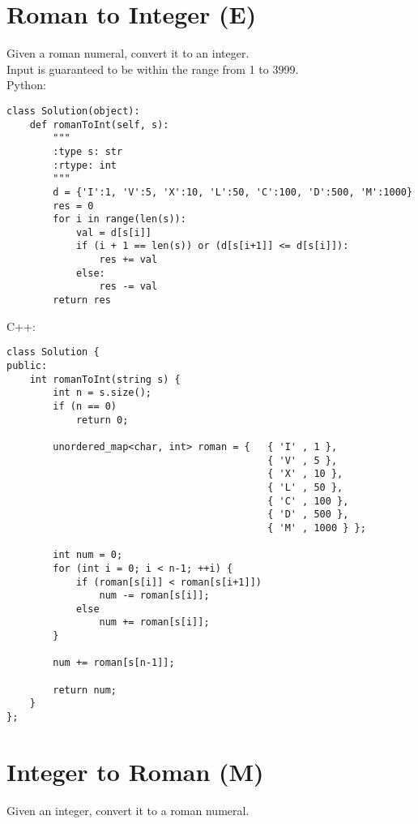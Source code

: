 \section{Roman to Integer (E)}
Given a roman numeral, convert it to an integer.\\

Input is guaranteed to be within the range from 1 to 3999.\\

Python:
\lstset{language=python}
\begin{lstlisting}
class Solution(object):
    def romanToInt(self, s):
        """
        :type s: str
        :rtype: int
        """
        d = {'I':1, 'V':5, 'X':10, 'L':50, 'C':100, 'D':500, 'M':1000}
        res = 0
        for i in range(len(s)):
            val = d[s[i]]
            if (i + 1 == len(s)) or (d[s[i+1]] <= d[s[i]]):
                res += val
            else:
                res -= val
        return res
\end{lstlisting}   
        
C++:
\lstset{language=c++}
\begin{lstlisting}
class Solution {
public:
    int romanToInt(string s) {
        int n = s.size();
        if (n == 0)
            return 0;

        unordered_map<char, int> roman = {   { 'I' , 1 },
                                             { 'V' , 5 },
                                             { 'X' , 10 },
                                             { 'L' , 50 },
                                             { 'C' , 100 },
                                             { 'D' , 500 },
                                             { 'M' , 1000 } };
                                         
        int num = 0;
        for (int i = 0; i < n-1; ++i) {
            if (roman[s[i]] < roman[s[i+1]])
                num -= roman[s[i]];
            else
                num += roman[s[i]];
        }
    
        num += roman[s[n-1]];
    
        return num;
    }
};
\end{lstlisting}   


\section{Integer to Roman (M)}
Given an integer, convert it to a roman numeral. \\

